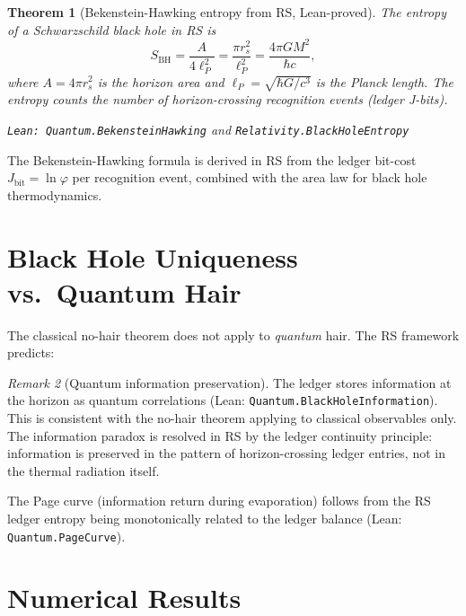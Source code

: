 \documentclass[12pt,a4paper]{article}
\newtheorem{theorem}{Theorem}[section]
\theoremstyle{definition}
\theoremstyle{remark}
\newtheorem{remark}[theorem]{Remark}
\begin{document}
\begin{theorem}[Bekenstein-Hawking entropy from RS, Lean-proved]
\label{thm:bh_entropy}
The entropy of a Schwarzschild black hole in RS is
\begin{equation}
  S_\mathrm{BH} = \frac{A}{4\ell_P^2} = \frac{\pi r_s^2}{\ell_P^2}
  = \frac{4\pi G M^2}{\hbar c},
\end{equation}
where $A = 4\pi r_s^2$ is the horizon area and $\ell_P = \sqrt{\hbar G/c^3}$
is the Planck length.  The entropy counts the number of horizon-crossing
recognition events (ledger J-bits).

\texttt{Lean: Quantum.BekensteinHawking} and \texttt{Relativity.BlackHoleEntropy}
\end{theorem}

The Bekenstein-Hawking formula is derived in RS from the ledger bit-cost
$J_\mathrm{bit} = \ln\varphi$ per recognition event, combined with the
area law for black hole thermodynamics.

\section{Black Hole Uniqueness vs.\ Quantum Hair}
\label{sec:quantum_hair}

The classical no-hair theorem does not apply to \emph{quantum} hair.
The RS framework predicts:

\begin{remark}[Quantum information preservation]
The ledger stores information at the horizon as quantum correlations
(Lean: \texttt{Quantum.BlackHoleInformation}).  This is consistent with
the no-hair theorem applying to classical observables only.  The
information paradox is resolved in RS by the ledger continuity principle:
information is preserved in the pattern of horizon-crossing ledger
entries, not in the thermal radiation itself.
\end{remark}

The Page curve (information return during evaporation) follows from the
RS ledger entropy being monotonically related to the ledger balance
(Lean: \texttt{Quantum.PageCurve}).

\section{Numerical Results}
\label{sec:numerical}
\end{document}
